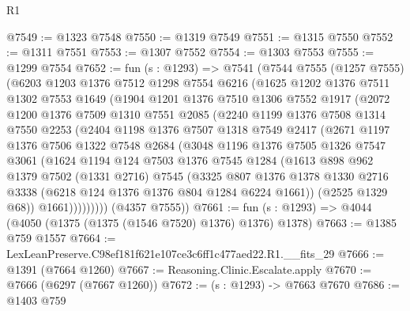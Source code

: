 \begin{lexlean}{R1}
\begin{coremodule}
@7549 := @1323 @7548
@7550 := @1319 @7549
@7551 := @1315 @7550
@7552 := @1311 @7551
@7553 := @1307 @7552
@7554 := @1303 @7553
@7555 := @1299 @7554
@7652 := fun (s : @1293) =>
  @7541
    (@7544
      @7555
      (@1257 @7555)
      (@6203
        @1203
        @1376
        @7512
        @1298
        @7554
        @6216
        (@1625
          @1202
          @1376
          @7511
          @1302
          @7553
          @1649
          (@1904
            @1201
            @1376
            @7510
            @1306
            @7552
            @1917
            (@2072
              @1200
              @1376
              @7509
              @1310
              @7551
              @2085
              (@2240
                @1199
                @1376
                @7508
                @1314
                @7550
                @2253
                (@2404
                  @1198
                  @1376
                  @7507
                  @1318
                  @7549
                  @2417
                  (@2671
                    @1197
                    @1376
                    @7506
                    @1322
                    @7548
                    @2684
                    (@3048
                      @1196
                      @1376
                      @7505
                      @1326
                      @7547
                      @3061
                      (@1624
                        @1194
                        @124
                        @7503
                        @1376
                        @7545
                        @1284
                        (@1613
                          @898
                          @962
                          @1379
                          @7502
                          (@1331 @2716)
                          @7545
                          (@3325
                            @807
                            @1376
                            @1378
                            @1330
                            @2716
                            @3338
                            (@6218 @124 @1376 @1376 @804 @1284 @6224 @1661))
                          (@2525 @1329 @68))
                        @1661)))))))))
      (@4357 @7555))
@7661 := fun (s : @1293) => @4044 (@4050 (@1375 (@1375 (@1546 @7520) @1376) @1376) @1378)
@7663 := @1385 @759 @1557
@7664 := LexLeanPreserve.C98ef181f621e107ce3c6ff1c477aed22.R1.__fits_29
@7666 := @1391 (@7664 @1260)
@7667 := Reasoning.Clinic.Escalate.apply
@7670 := @7666 (@6297 (@7667 @1260))
@7672 := (s : @1293) -> @7663 @7670
@7686 := @1403
    @759

\end{coremodule}
\end{lexlean}
